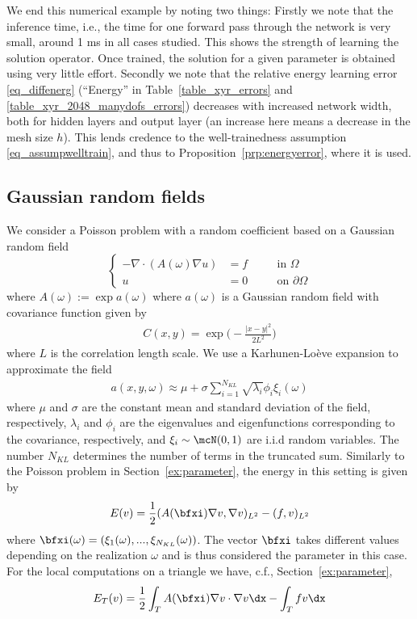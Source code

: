 \documentclass[12pt]{article}
\begin{document}
We end this numerical example by noting two things: Firstly we note that the inference time, i.e., the time for one forward pass through the network is very small, around 1 ms in all cases studied. This shows the strength of learning the solution operator. Once trained, the solution for a given parameter is obtained using very little effort. Secondly we note that the relative energy learning error \eqref{eq_diffenerg} (``Energy'' in Table~\ref{table_xyr_errors} and \ref{table_xyr_2048_manydofs_errors}) decreases with increased network width, both for hidden layers and output layer (an increase here means a decrease in the mesh size $h$). This lends credence to the well-trainedness assumption \eqref{eq_assumpwelltrain}, and thus to Proposition~\ref{prp:energyerror}, where it is used.

\subsection{Gaussian random fields}\label{ex:grf}
We consider a Poisson problem with a random coefficient based on a Gaussian random field
\begin{equation}
\left\{
\begin{alignedat}{2}
	-\nabla\cdot (A(\omega)  \nabla u) &= f \quad &&\text{in } \Omega \\
	u &= 0 &&\text{on } \partial \Omega
\end{alignedat}
\right.
\end{equation}
where $A(\omega):=\exp{a(\omega)}$ where $a(\omega)$ is a Gaussian random field with covariance function given by
\begin{align}
	C(x,y) = \exp{\bigg(-\frac{|x-y|^2}{2L^2}\bigg)}
\end{align}
where $L$ is the correlation length scale. We use a Karhunen-Lo\`{e}ve expansion to approximate the field
\begin{align}
	a(x,y,\omega) \approx \mu + \sigma \sum_{i=1}^{N_{KL}} \sqrt{\lambda_i}\phi_i  \xi_i(\omega)
\end{align}
where $\mu$ and $\sigma$ are the constant mean and standard deviation of the field, respectively, $\lambda_i$ and $\phi_i$ are the eigenvalues and eigenfunctions corresponding to the covariance, respectively, and $\xi_i \sim \mcN(0,1)$ are i.i.d random variables. The number $N_{KL}$ determines the number of terms in the truncated sum. Similarly to the Poisson problem in Section~\ref{ex:parameter}, the energy in this setting is given by
\begin{align}
	E(v) = \frac{1}{2}(A(\bfxi)\nabla v, \nabla v)_{L^2} - (f, v)_{L^2}
\end{align}
where $\bfxi(\omega) = (\xi_1(\omega),...,\xi_{N_{KL}}(\omega))$. The vector $\bfxi$ takes different values depending on the realization $\omega$ and is thus considered the parameter in this case. For the local computations on a triangle we have, c.f., Section~\ref{ex:parameter},
\begin{align}
	E_T(v) = \frac{1}{2} \int_T A(\bfxi)\nabla v \cdot \nabla v \dx - \int_T fv \dx
\end{align}
\end{document}
